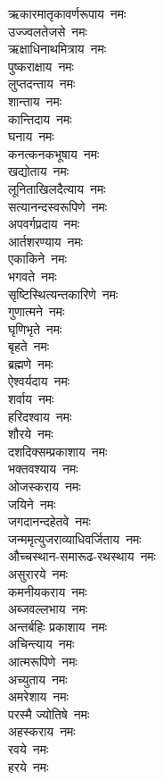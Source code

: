 \begin{multicols}{2}
\begin{flushleft}
ऋकारमातृकावर्णरूपाय~नमः\\
उज्ज्वलतेजसे~नमः\\
ऋक्षाधिनाथमित्राय~नमः\\
पुष्कराक्षाय~नमः\\
लुप्तदन्ताय~नमः\\
शान्ताय~नमः\\
कान्तिदाय~नमः\\
घनाय~नमः\\
कनत्कनकभूषाय~नमः\hfill{}\\
खद्योताय~नमः\\
लूनिताखिलदैत्याय~नमः\\
सत्यानन्दस्वरूपिणे~नमः\\
अपवर्गप्रदाय~नमः\\
आर्तशरण्याय~नमः\\
एकाकिने~नमः\\
भगवते~नमः\\
सृष्टिस्थित्यन्तकारिणे~नमः\\
गुणात्मने~नमः\\
घृणिभृते~नमः\hfill{}\\
बृहते~नमः\\
ब्रह्मणे~नमः\\
ऐश्वर्यदाय~नमः\\
शर्वाय~नमः\\
हरिदश्वाय~नमः\\
शौरये~नमः\\
दशदिक्सम्प्रकाशाय~नमः\\
भक्तवश्याय~नमः\\
ओजस्कराय~नमः\\
जयिने~नमः\hfill{}\\
जगदानन्दहेतवे~नमः\\
जन्ममृत्युजराव्याधिवर्जिताय~नमः\\
औच्चस्थान-समारूढ-रथस्थाय~नमः\\
असुरारये~नमः\\
कमनीयकराय~नमः\\
अब्जवल्लभाय~नमः\\
अन्तर्बहिः प्रकाशाय~नमः\\
अचिन्त्याय~नमः\\
आत्मरूपिणे~नमः\\
अच्युताय~नमः\hfill{}\\
अमरेशाय~नमः\\
परस्मै ज्योतिषे~नमः\\
अहस्कराय~नमः\\
रवये~नमः\\
हरये~नमः\\

\end{flushleft}
\end{multicols}
